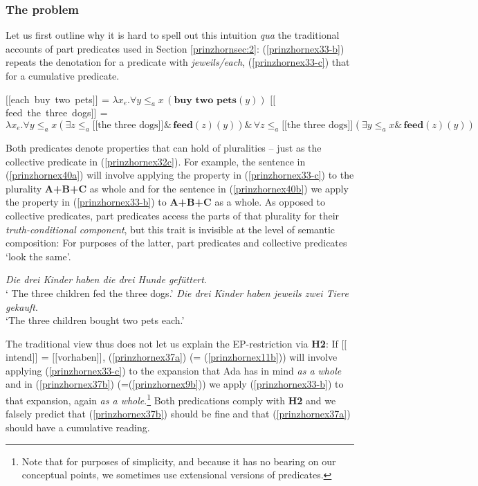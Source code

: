 \documentclass[output=paper,colorlinks,citecolor=brown,
]{langscibook}
\newcommand{\sem}[2]{\mbox{$[\![${#2}$]\!]^{#1}$}} %
\begin{document}
\subsubsection{The problem}

Let us first outline why it is hard to spell out this intuition \textit{qua} the traditional accounts of part predicates used in Section \ref{prinzhornsec:2}: (\ref{prinzhornex33-b}) repeats the denotation for a 
 predicate with \textit{jeweils/each}, (\ref{prinzhornex33-c}) that for a cumulative predicate.

\ea \label{prinzhornexden}
\ea \sem{}{each buy two pets} = $\lambda x_{e}. \forall y \le_{a} x \,(\textbf{buy  two pets}(y))$\label{prinzhornex33-b}
\ex	 \sem{}{feed the three dogs} = $\lambda x_{e}. \forall y \le_{a} x (\exists z \le_{a} \sem{}{the three dogs} \&\, \textbf{feed}(z)(y)) \&\, \forall z \le_{a} \sem{}{the three dogs} (\exists y \le_{a} x \& \,\textbf{feed}(z)(y))$ \label{prinzhornex33-c}
\z\z

Both predicates denote properties that can hold of pluralities -- just as the collective predicate in (\ref{prinzhornex32c}). For example, the sentence in (\ref{prinzhornex40a}) will involve applying the property in (\ref{prinzhornex33-c}) to the plurality \textbf{A+B+C} as whole and  for the sentence in (\ref{prinzhornex40b}) we apply the property in (\ref{prinzhornex33-b}) to \textbf{A+B+C} as a whole. As opposed to collective predicates, part predicates access the parts of that plurality for their \textit{truth-conditional component}, but this trait is invisible at the level of semantic composition: For purposes of the latter, part predicates and collective predicates `look the same'. 



\ea \label{prinzhornex40}
\ea \textit{Die drei Kinder haben die drei Hunde gef\"{u}ttert}.\\
` The three children fed the three dogs.' \label{prinzhornex40a}
\ex \textit{Die drei Kinder haben jeweils zwei Tiere gekauft}.\\
`The three children bought two pets each.' \label{prinzhornex40b}
\z\z

The traditional view thus does not let us explain the EP-restriction via {\bf H2}: If \sem{}{intend} = \sem{}{vorhaben},  (\ref{prinzhornex37a})  (= (\ref{prinzhornex11b})) will involve applying (\ref{prinzhornex33-c}) to the expansion that Ada has in mind \textit{as a whole} and in (\ref{prinzhornex37b}) (=(\ref{prinzhornex9b})) we apply (\ref{prinzhornex33-b}) to that expansion, again \textit{as a whole}.\footnote{Note that for purposes of simplicity, and because it has no bearing on our conceptual points, we sometimes use extensional versions of predicates.} Both  predications comply with \textbf{H2} and we falsely predict that (\ref{prinzhornex37b}) should be fine and that (\ref{prinzhornex37a}) should have a cumulative reading.
\end{document}
